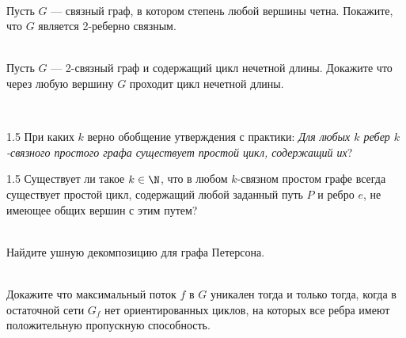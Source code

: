 \documentclass[a4paper,12pt,twoside]{article}
\begin{document}
\begin{?}[Разминочная]\ \\
     Пусть \(G\) --- связный граф, в котором степень любой вершины четна. Покажите, что \(G\) является 2-реберно связным.
\end{?}
\begin{?}\ \\
     Пусть \(G\) --- 2-связный граф и содержащий цикл нечетной длины. Докажите что через любую вершину \(G\) проходит цикл нечетной длины. 
\end{?}
\begin{?} \ 
    \begin{tasklist}
        \item[1.5] При каких \(k\) верно обобщение утверждения с практики: \textit{Для любых \(k\) ребер \(k\)-связного простого графа существует простой цикл, содержащий их}?
        \item[1.5] Существует ли такое \(k \in \N\), что в любом \(k\)-связном простом графе всегда существует простой цикл, содержащий любой заданный путь \(P\) и ребро \(e\), не имеющее общих вершин с этим путем?
    \end{tasklist}
\end{?}
\begin{?}\ \\
     Найдите ушную декомпозицию для графа Петерсона.
\end{?}
\begin{?}\ \\
     Докажите что максимальный поток \(f\) в \(G\) уникален тогда и только тогда, когда в остаточной сети \(G_f\) нет ориентированных циклов, на которых все ребра имеют положительную пропускную способность. 
\end{?}
\end{document}
